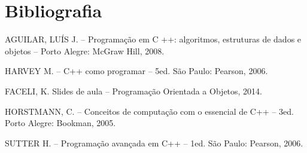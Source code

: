 \documentclass[a4paper]{article}
\begin{document}
\pagebreak

\section{Bibliografia}

\begin{thebibliography}{x}

 AGUILAR, LUÍS J. – Programação em C ++: algoritmos, estruturas de dados e objetos – Porto Alegre: McGraw Hill, 2008.

 HARVEY M. – C++ como programar – 5ed. São Paulo: Pearson, 2006.

 FACELI, K. Slides de aula – Programação Orientada a Objetos, 2014.

 HORSTMANN, C. – Conceitos de computação com o essencial de C++ – 3ed. Porto Alegre: Bookman, 2005.

SUTTER H. – Programação avançada em C++ – 1ed. São Paulo: Pearson, 2006. 

\end{thebibliography}
\end{document}

